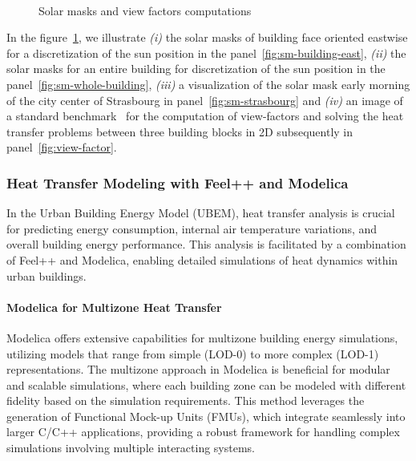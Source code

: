 \documentclass[runningheads]{llncs}
\begin{document}
\begin{figure}[ht]
\centering
{}
\hfill
{}\\
\hfill
{}
\caption{Solar masks and view factors computations}
\label{fig:solar-masks-vf}
\end{figure}

In the figure~\ref{fig:solar-masks-vf}, we illustrate \textit{(i)} the solar masks of building face oriented eastwise for a discretization of the sun position in the panel~\ref{fig:sm-building-east}, \textit{(ii)} the solar masks for an entire building for discretization of the sun position in the panel~\ref{fig:sm-whole-building}, \textit{(iii)} a visualization of the solar mask early morning of the city center of Strasbourg in panel~\ref{fig:sm-strasbourg} and \textit{(iv)} an image of a standard benchmark~\cite{van_eck_surface_2016} for the computation of view-factors and solving the heat transfer problems between three building blocks in 2D subsequently in panel~\ref{fig:view-factor}.

\subsubsection{Heat Transfer Modeling with Feel++ and Modelica}
In the Urban Building Energy Model (UBEM), heat transfer analysis is crucial for predicting energy consumption, internal air temperature variations, and overall building energy performance. This analysis is facilitated by a combination of Feel++ and Modelica, enabling detailed simulations of heat dynamics within urban buildings.

\paragraph{Modelica for Multizone Heat Transfer}
Modelica offers extensive capabilities for multizone building energy simulations, utilizing models that range from simple (LOD-0) to more complex (LOD-1) representations. The multizone approach in Modelica is beneficial for modular and scalable simulations, where each building zone can be modeled with different fidelity based on the simulation requirements. This method leverages the generation of Functional Mock-up Units (FMUs), which integrate seamlessly into larger C/C++ applications, providing a robust framework for handling complex simulations involving multiple interacting systems.
\end{document}

